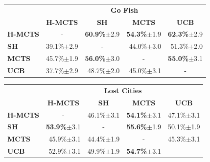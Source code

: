 \documentclass[a4paper]{llncs}
\begin{document}
\begin{table}[ht]
\centering
\setlength{\tabcolsep}{10pt}

\begin{tabular}{@{}lrrrr@{}}
\toprule
& \multicolumn{4}{c}{\textbf{Go Fish}} \\
& \multicolumn{1}{c}{\textbf{H-MCTS}} & \multicolumn{1}{c}{\textbf{SH}} & \multicolumn{1}{c}{\textbf{MCTS}} & \multicolumn{1}{c}{\textbf{UCB}} \\[1mm] \cmidrule(l){2-5} 
\textbf{H-MCTS} & \multicolumn{1}{c}{-}		& \textbf{60.9\%}$\pm$2.9 	& \textbf{54.3\%}$\pm$1.9 	& \textbf{62.3\%}$\pm$2.9 	\\[.5mm] 
\textbf{SH}     & 39.1\%$\pm$2.9 			& \multicolumn{1}{c}{-} 	& 44.0\%$\pm$3.0 			& 51.3\%$\pm$2.0 			\\[.5mm] 
\textbf{MCTS}   & 45.7\%$\pm$1.9 			& \textbf{56.0\%}$\pm$3.0 	& \multicolumn{1}{c}{-} 	& \textbf{55.0\%}$\pm$3.1 	\\[.5mm]
\textbf{UCB}	& 37.7\%$\pm$2.9			& 48.7\%$\pm$2.0 			& 45.0\%$\pm$3.1 			& \multicolumn{1}{c}{-} 	\\[.5mm] 
\end{tabular}

\begin{tabular}{@{}lrrrr@{}}
\toprule
& \multicolumn{4}{c}{\textbf{Lost Cities}} \\
& \multicolumn{1}{c}{\textbf{H-MCTS}} & \multicolumn{1}{c}{\textbf{SH}} & \multicolumn{1}{c}{\textbf{MCTS}} & \multicolumn{1}{c}{\textbf{UCB}} \\ [1mm] \cmidrule(l){2-5} 
\textbf{H-MCTS} & \multicolumn{1}{c}{-}		& 46.1\%$\pm$3.1 			& \textbf{54.1\%}$\pm$3.1  	& 47.1\%$\pm$3.1 			\\[.5mm] 
\textbf{SH}     & \textbf{53.9\%}$\pm$3.1 	& \multicolumn{1}{c}{-} 	& \textbf{55.6\%}$\pm$1.9  	& 50.1\%$\pm$1.9  			\\[.5mm] 
\textbf{MCTS}   & 45.9\%$\pm$3.1		 	& 44.4\%$\pm$1.9  			& \multicolumn{1}{c}{-} 	& 45.3\%$\pm$3.1  			\\[.5mm]
\textbf{UCB}	& 52.9\%$\pm$3.1			& 49.9\%$\pm$1.9  			& \textbf{54.7\%}$\pm$3.1 	& \multicolumn{1}{c}{-} 	\\[.5mm]
\end{tabular}


\end{table}
\end{document}

